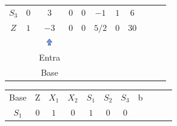\begin{frame}
{\begin{table}
\begin{tabular}{c c c c c c c c c c c}
				\cline{1-8} 
				\cellcolor{blue!100} \color{red} $\scriptstyle S_3$
				& \cellcolor{yellow!50} $\scriptstyle 0$
				& \cellcolor{gray!50} $\scriptstyle 3$
				& \cellcolor{yellow!50} $\scriptstyle 0$
				& \cellcolor{yellow!50} $\scriptstyle 0$
				& \cellcolor{yellow!50} $\scriptstyle -1$
				& \cellcolor{yellow!50} $\scriptstyle 1$
				& \cellcolor{yellow!50} $\scriptstyle 6$
				&
				&
				& \\
				\cline{1-8}
				\cellcolor{blue!100} \color{white} $\scriptstyle Z$
				& \cellcolor{yellow!50} $\scriptstyle 1$
				& \cellcolor{gray!50} $\scriptstyle -3$
				& \cellcolor{yellow!50} $\scriptstyle 0$
				& \cellcolor{yellow!50} $\scriptstyle 0$
				& \cellcolor{yellow!50} $\scriptstyle 5/2$
				& \cellcolor{yellow!50} $\scriptstyle 0$
				& \cellcolor{yellow!50} $\scriptstyle 30$ 
				&
				&
				& \\
				\cline{1-8}
				& 
				& \includegraphics[width=0.3cm,height=0.3cm]{setacima.jpg}
				& 
				& 
				& 
				& 
				&  
				&
				&
				& \\ 
				& 
				& \scriptsize \color{red} Entra
				&  
				& 
				& 
				& 
				&  
				&
				&
				& \\
				& 
				& \scriptsize \color{red} Base
				&  
				& 
				& 
				& 
				&  
				&
				&
				& \\
			\end{tabular}
		\end{table}			
	}	
	{		
		\begin{table}		
			\begin{tabular}{c c c c c c c c c c c}
				\cline{1-8} 
				\cellcolor{blue!100} \color{white} \scriptsize Base 
				&\cellcolor{blue!100} \color{white} \scriptsize Z 
				&\cellcolor{blue!100} \color{white} $\scriptstyle X_1$ 
				&\cellcolor{blue!100} \color{red} $\scriptstyle X_2$ 
				&\cellcolor{blue!100} \color{red} $\scriptstyle S_1$ 
				&\cellcolor{blue!100} \color{white} $\scriptstyle S_2$ 
				&\cellcolor{blue!100} \color{red} $\scriptstyle S_3$ 
				&\cellcolor{blue!100} \color{white} \scriptsize b
				&
				&
				& \\
				\cline{1-8}
				\cellcolor{blue!100} \color{red} $\scriptstyle S_1$
				& \cellcolor{yellow!50} $\scriptstyle 0$
				& \cellcolor{gray!50} $\scriptstyle 1$
				& \cellcolor{yellow!50} $\scriptstyle 0$
				& \cellcolor{yellow!50} $\scriptstyle 1$
				& \cellcolor{yellow!50} $\scriptstyle 0$
				& \cellcolor{yellow!50} $\scriptstyle 0$

\end{tabular}
\end{table}}
\end{frame}
